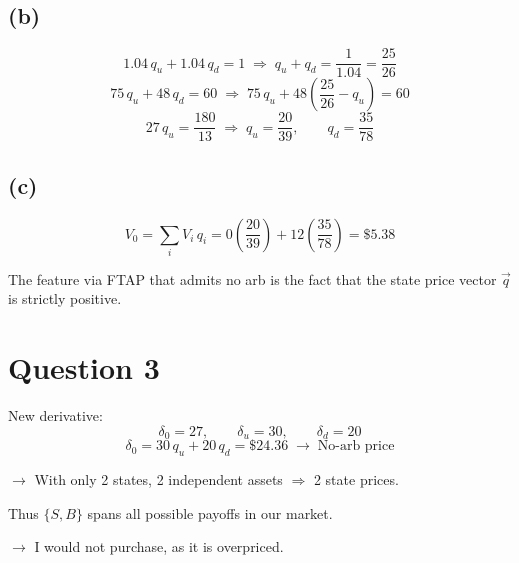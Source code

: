 \documentclass[11pt]{article}
\begin{document}
\subsection*{(b)}

\[
1.04\,q_u + 1.04\,q_d = 1 \;\Rightarrow\; q_u + q_d = \frac{1}{1.04} = \frac{25}{26}
\]
\[
75\,q_u + 48\,q_d = 60 \;\Rightarrow\; 75\,q_u + 48\left(\frac{25}{26} - q_u\right) = 60
\]
\[
27\,q_u = \frac{180}{13} \;\Rightarrow\; q_u = \frac{20}{39}, \qquad q_d = \frac{35}{78}
\]

\subsection*{(c)}

\[
V_0 = \sum_i V_i\, q_i = 0\left(\frac{20}{39}\right) + 12\left(\frac{35}{78}\right) = \$5.38
\]

The feature via FTAP that admits no arb is the fact that the state price vector $\vec{q}$ is strictly positive.

\newpage
\section*{Question 3}

New derivative:
\[
\delta_0 = 27, \qquad \delta_u = 30, \qquad \delta_d = 20
\]
\[
\delta_0 = 30\,q_u + 20\,q_d = \$24.36 \;\rightarrow\; \text{No-arb price}
\]

$\rightarrow$ With only 2 states, 2 independent assets $\Rightarrow$ 2 state prices.

Thus $\{S, B\}$ spans all possible payoffs in our market.

$\rightarrow$ I would not purchase, as it is overpriced.
\end{document}
